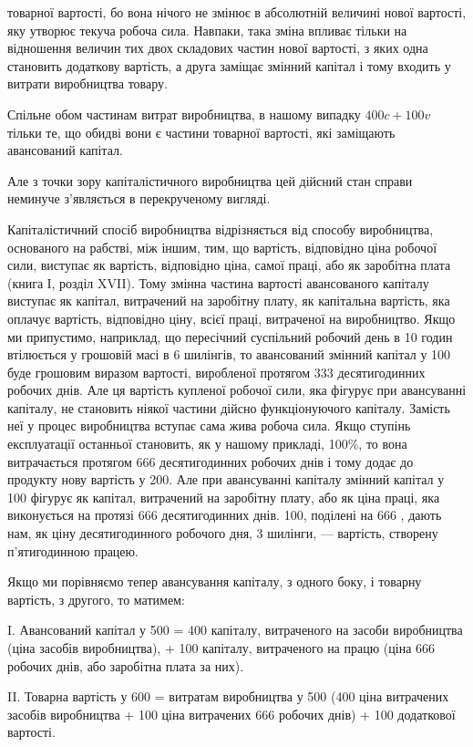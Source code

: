 \parcont{}  %
товарної вартості, бо вона нічого не змінює в абсолютній величині
нової вартості, яку утворює текуча робоча сила. Навпаки,
така зміна впливає тільки на відношення величин тих двох складових
частин нової вартості, з яких одна становить додаткову
вартість, а друга заміщає змінний капітал і тому входить у витрати
виробництва товару.

Спільне обом частинам витрат виробництва, в нашому випадку
$400 c + 100v$ тільки те, що обидві вони є частини товарної
вартості, які заміщають авансований капітал.

Але з точки зору капіталістичного виробництва цей дійсний
стан справи неминуче з’являється в перекрученому вигляді.

Капіталістичний спосіб виробництва відрізняється від способу
виробництва, основаного на рабстві, між іншим, тим, що
вартість, відповідно ціна робочої сили, виступає як вартість,
відповідно ціна, самої праці, або як заробітна плата (книга І,
розділ XVII). Тому змінна частина вартості авансованого капіталу
виступає як капітал, витрачений на заробітну плату,
як капітальна вартість, яка оплачує вартість, відповідно ціну,
всієї праці, витраченої на виробництво. Якщо ми припустимо,
наприклад, що пересічний суспільний робочий день в 10 годин
втілюється у грошовій масі в 6 шилінгів, то авансований
змінний капітал у 100 буде грошовим
виразом вартості, виробленої протягом 333 десятигодинних
робочих днів. Але ця вартість купленої робочої сили, яка фігурує
при авансуванні капіталу, не становить ніякої частини
дійсно функціонуючого капіталу. Замість неї у процес виробництва
вступає сама жива робоча сила. Якщо ступінь експлуатації
останньої становить, як у нашому прикладі, 100\%, то вона
витрачається протягом 666 десятигодинних робочих днів і тому
додає до продукту нову вартість у 200. Але
при авансуванні капіталу змінний капітал у 100
фігурує як капітал, витрачений на заробітну плату, або як
ціна праці, яка виконується на протязі 666  десятигодинних
днів. 100, поділені на 666 , дають нам, як
ціну десятигодинного робочого дня, 3 шилінги, — вартість, створену
п’ятигодинною працею.

Якщо ми порівняємо тепер авансування капіталу, з одного
боку, і товарну вартість, з другого, то матимем:

I. Авансований капітал у 500 = 400 капіталу, витраченого на засоби виробництва
(ціна засобів виробництва), + 100 капіталу,
витраченого на працю (ціна 666 робочих днів, або заробітна
плата за них).

II. Товарна вартість у 600 = витратам виробництва
у 500 (400
ціна витрачених засобів виробництва + 100
ціна витрачених 666 робочих днів) + 100 додаткової вартості.
